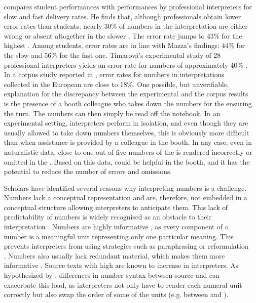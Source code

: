 \documentclass[output=paper]{langsci/langscibook}
\begin{document}
\citet{Korpal2016} compares student performances with performances by professional interpreters for slow and fast delivery rates. He finds that, although professionals obtain lower error rates than students, nearly 30\% of numbers in the interpretation are either wrong or absent altogether in the slower . The error rate jumps to 43\% for the highest . Among students, error rates are in line with Mazza’s findings: 44\% for the slow  and 56\% for the fast one. Timarová’s experimental study of 28 professional interpreters yields an error rate for numbers of approximately 40\% \citep{Timarova2012}. In a corpus study reported in \citet{Collard2017}, error rates for numbers in interpretations collected in the European  are close to 18\%. One possible, but unverifiable, explanation for the discrepancy between the experimental and the corpus results is the presence of a booth colleague who takes down the numbers for the  ensuring the turn. The numbers can then simply be read off the notebook. In an experimental setting, interpreters perform in isolation, and even though they are usually allowed to take down numbers themselves, this is obviously more difficult than when assistance is provided by a colleague in the booth. In any case, even in naturalistic data, close to one out of five numbers of the  is rendered incorrectly or omitted in the . Based on this data,  could be helpful in the booth, and it has the potential to reduce the number of errors and omissions.

Scholars have identified several reasons why interpreting numbers is a challenge. Numbers lack a conceptual representation \citep{Timarova2012,Seeber2015} and are, therefore, not embedded in a conceptual structure allowing interpreters to anticipate them. This lack of predictability of numbers is widely recognised as an obstacle to their interpretation \citep{Braun1996,Mazza2001,Pinochi2009,Mead2015}. Numbers are highly informative \citep{Alessandrini1990}, as every component of a number is a meaningful unit representing only one particular meaning. This prevents interpreters from using strategies such as paraphrasing or reformulation \citep{Pinochi2009}. Numbers also usually lack redundant material, which makes them more informative \citep{Gile1995,Seeber2015}. Source texts with high  are known to increase  in interpreters. As hypothesized by \citet{Pinochi2009}, differences in number syntax between source and  can exacerbate this load, as interpreters not only have to render each numeral unit correctly but also swap the order of some of the units (e.g. between  and ).
\end{document}
